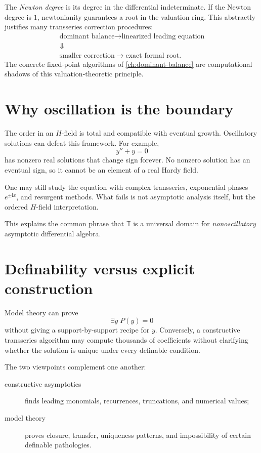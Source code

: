 \documentclass[11pt,openany]{book}
\theoremstyle{definition}
\theoremstyle{plain}
\theoremstyle{remark}
\newcommand{\T}{\mathbb{T}}
\newcommand{\ii}{\mathrm{i}}
\begin{document}
The \emph{Newton degree} is its degree in the differential indeterminate. If the Newton degree is $1$, newtonianity guarantees a root in the valuation ring. This abstractly justifies many transseries correction procedures:
\[
 \begin{gathered}
  \text{dominant balance}
  \longrightarrow
  \text{linearized leading equation}\\[-0.2ex]
  \Downarrow\\[-0.2ex]
  \text{smaller correction}
  \longrightarrow
  \text{exact formal root}.
 \end{gathered}
\]
The concrete fixed-point algorithms of \cref{ch:dominant-balance} are computational shadows of this valuation-theoretic principle.

\section{Why oscillation is the boundary}

The order in an $H$-field is total and compatible with eventual growth. Oscillatory solutions can defeat this framework. For example,
\[
 y''+y=0
\]
has nonzero real solutions that change sign forever. No nonzero solution has an eventual sign, so it cannot be an element of a real Hardy field.

One may still study the equation with complex transseries, exponential phases $e^{\pm\ii x}$, and resurgent methods. What fails is not asymptotic analysis itself, but the ordered $H$-field interpretation.

This explains the common phrase that $\T$ is a universal domain for \emph{nonoscillatory} asymptotic differential algebra.

\section{Definability versus explicit construction}

Model theory can prove
\[
 \exists y\;P(y)=0
\]
without giving a support-by-support recipe for $y$. Conversely, a constructive transseries algorithm may compute thousands of coefficients without clarifying whether the solution is unique under every definable condition.

The two viewpoints complement one another:
\begin{description}
 \item[constructive asymptotics] finds leading monomials, recurrences, truncations, and numerical values;
 \item[model theory] proves closure, transfer, uniqueness patterns, and impossibility of certain definable pathologies.
\end{description}
\end{document}
